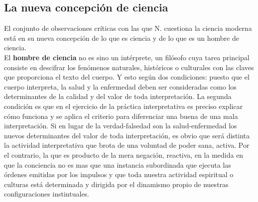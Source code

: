 \documentclass[a4paper, 10pt, twocolumn, spanish]{article}
\begin{document}
\subsection{La nueva concepción de ciencia}
\label{sec:orgdd081e9}
El conjunto de observaciones críticas con las que N. cuestiona la
ciencia moderna está en su nueva concepción de lo que es ciencia y de
lo que es un hombre de ciencia.\\[0pt]
El \textbf{hombre de ciencia} no es sino un intérprete, un filósofo cuya
tarea principal consiste en descifrar los fenómenos naturales,
históricos o culturales con las claves que proporciona el texto del
cuerpo. Y esto según dos condiciones: puesto que el cuerpo interpreta,
la salud y la enfermedad deben ser consideradas como los determinantes
de la calidad y del valor de toda interpretación. La segunda condición
es que en el ejercicio de la práctica interpretativa es preciso
explicar cómo funciona y se aplica el criterio para diferenciar una
buena de una mala interpretación. Si en lugar de la verdad-falsedad
son la salud-enfermedad los nuevos determinantes del valor de toda
interpretación, es obvio que será distinta la actividad interpretativa
que brota de una voluntad de poder sana, activa. Por el contrario, la
que es producto de la mera negación, reactiva, en la medida en que la
conciencia no es mas que una instancia subordinada que ejecuta las
órdenes emitidas por los impulsos y que toda nuestra actividad
espiritual o culturas está determinada y dirigida por el dinamismo
propio de nuestras configuraciones instintuales.\\[0pt]
\end{document}
